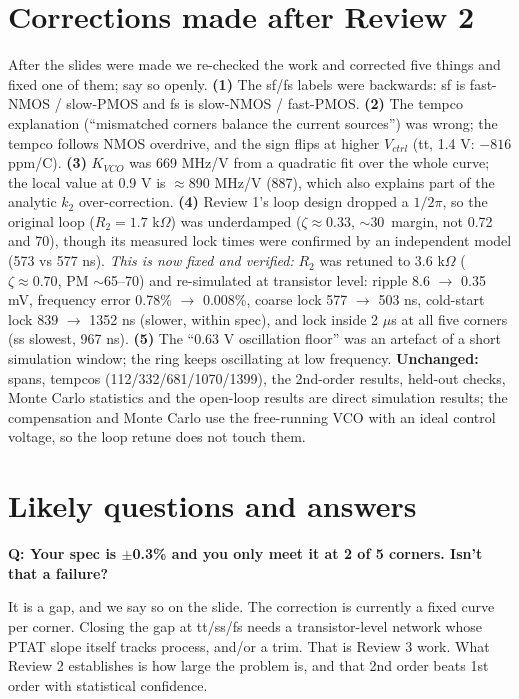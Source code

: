 \documentclass[11pt,a4paper]{article}
\newcommand{\qa}[2]{\par\smallskip\noindent\textbf{Q: #1}\par\noindent\hspace*{1em}\begin{minipage}[t]{\dimexpr\linewidth-1em}#2\end{minipage}\par}
\begin{document}
\section{Corrections made after Review 2}\label{sec:corr}
\begin{owned}
After the slides were made we re-checked the work and corrected five things and fixed one of them; say so openly. \textbf{(1)} The sf/fs labels were backwards: sf is fast-NMOS / slow-PMOS and fs is slow-NMOS / fast-PMOS. \textbf{(2)} The tempco explanation (``mismatched corners balance the current sources'') was wrong; the tempco follows NMOS overdrive, and the sign flips at higher $V_{ctrl}$ (tt, 1.4 V: $-816$ ppm/\textdegree C). \textbf{(3)} $K_{VCO}$ was 669 MHz/V from a quadratic fit over the whole curve; the local value at 0.9 V is $\approx$890 MHz/V (887), which also explains part of the analytic $k_2$ over-correction. \textbf{(4)} Review 1's loop design dropped a $1/2\pi$, so the original loop ($R_2=1.7$ k$\Omega$) was underdamped ($\zeta\approx0.33$, $\sim$30\textdegree\ margin, not 0.72 and 70\textdegree), though its measured lock times were confirmed by an independent model (573 vs 577 ns). \emph{This is now fixed and verified:} $R_2$ was retuned to 3.6 k$\Omega$ ($\zeta\approx0.70$, PM $\sim$65--70\textdegree) and re-simulated at transistor level: ripple 8.6 $\to$ 0.35 mV, frequency error 0.78\% $\to$ 0.008\%, coarse lock 577 $\to$ 503 ns, cold-start lock 839 $\to$ 1352 ns (slower, within spec), and lock inside 2 $\mu$s at all five corners (ss slowest, 967 ns). \textbf{(5)} The ``0.63 V oscillation floor'' was an artefact of a short simulation window; the ring keeps oscillating at low frequency. \textbf{Unchanged:} spans, tempcos (112/332/681/1070/1399), the 2nd-order results, held-out checks, Monte Carlo statistics and the open-loop results are direct simulation results; the compensation and Monte Carlo use the free-running VCO with an ideal control voltage, so the loop retune does not touch them.
\end{owned}

\section{Likely questions and answers}
\qa{Your spec is $\pm$0.3\% and you only meet it at 2 of 5 corners. Isn't that a failure?}{It is a gap, and we say so on the slide. The correction is currently a fixed curve per corner. Closing the gap at tt/ss/fs needs a transistor-level network whose PTAT slope itself tracks process, and/or a trim. That is Review 3 work. What Review 2 establishes is how large the problem is, and that 2nd order beats 1st order with statistical confidence.}
\end{document}
